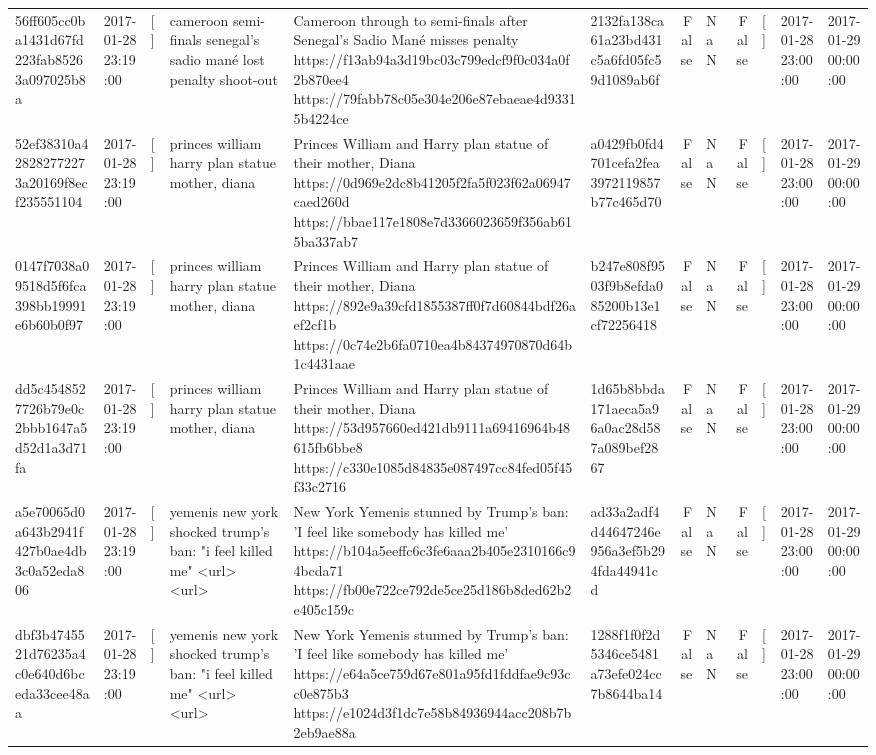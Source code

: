 \begin{tabular}{llllllrlrlll}
56ff605cc0ba1431d67fd223fab85263a097025b8a & 2017-01-28 23:19:00 & [] & cameroon semi-finals senegal's sadio mané lost penalty shoot-out & Cameroon through to semi-finals after Senegal’s Sadio Mané misses penalty https://f13ab94a3d19bc03c799edcf9f0c034a0f2b870ee4 https://79fabb78c05e304e206e87ebaeae4d93315b4224ce & 2132fa138ca61a23bd431c5a6fd05fc59d1089ab6f & False & NaN & False & [] & 2017-01-28 23:00:00 & 2017-01-29 00:00:00 \\
52ef38310a428282772273a20169f8ecf235551104 & 2017-01-28 23:19:00 & [] & princes william harry plan statue mother, diana & Princes William and Harry plan statue of their mother, Diana https://0d969e2dc8b41205f2fa5f023f62a06947caed260d https://bbae117e1808e7d3366023659f356ab615ba337ab7 & a0429fb0fd4701cefa2fea3972119857b77c465d70 & False & NaN & False & [] & 2017-01-28 23:00:00 & 2017-01-29 00:00:00 \\
0147f7038a09518d5f6fca398bb19991e6b60b0f97 & 2017-01-28 23:19:00 & [] & princes william harry plan statue mother, diana & Princes William and Harry plan statue of their mother, Diana https://892e9a39cfd1855387ff0f7d60844bdf26aef2cf1b https://0c74e2b6fa0710ea4b84374970870d64b1c4431aae & b247e808f9503f9b8efda085200b13e1cf72256418 & False & NaN & False & [] & 2017-01-28 23:00:00 & 2017-01-29 00:00:00 \\
dd5c4548527726b79e0c2bbb1647a5d52d1a3d71fa & 2017-01-28 23:19:00 & [] & princes william harry plan statue mother, diana & Princes William and Harry plan statue of their mother, Diana https://53d957660ed421db9111a69416964b48615fb6bbe8 https://c330e1085d84835e087497cc84fed05f45f33c2716 & 1d65b8bbda171aeca5a96a0ac28d587a089bef2867 & False & NaN & False & [] & 2017-01-28 23:00:00 & 2017-01-29 00:00:00 \\
a5e70065d0a643b2941f427b0ae4db3c0a52eda806 & 2017-01-28 23:19:00 & [] & yemenis new york shocked trump's ban: "i feel killed me" <url> <url> & New York Yemenis stunned by Trump's ban: 'I feel like somebody has killed me' https://b104a5eeffc6c3fe6aaa2b405e2310166c94bcda71 https://fb00e722ce792de5ce25d186b8ded62b2e405c159c & ad33a2adf4d44647246e956a3ef5b294fda44941cd & False & NaN & False & [] & 2017-01-28 23:00:00 & 2017-01-29 00:00:00 \\
dbf3b4745521d76235a4c0e640d6bceda33cee48aa & 2017-01-28 23:19:00 & [] & yemenis new york shocked trump's ban: "i feel killed me" <url> <url> & New York Yemenis stunned by Trump's ban: 'I feel like somebody has killed me' https://e64a5ce759d67e801a95fd1fddfae9c93cc0e875b3 https://e1024d3f1dc7e58b84936944acc208b7b2eb9ae88a & 1288f1f0f2d5346ce5481a73efe024cc7b8644ba14 & False & NaN & False & [] & 2017-01-28 23:00:00 & 2017-01-29 00:00:00 \\

\end{tabular}
